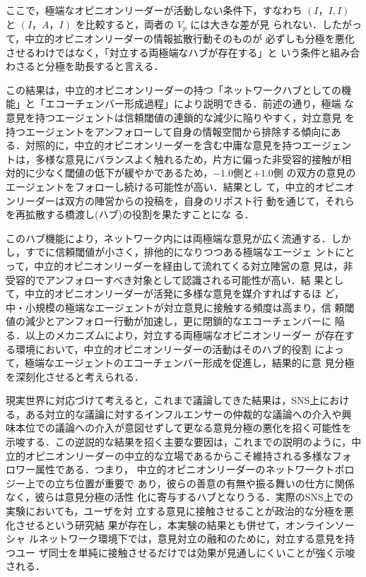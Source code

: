 \documentclass[a4j]{ujarticle}
\def\postOpVar{V_p}
\begin{document}
ここで，極端なオピニオンリーダーが活動しない条件下，すなわち $(I，I,
I)$ と $(I，A，I)$ を比較すると，両者の $\postOpVar$ には大きな差が見
られない．したがって，中立的オピニオンリーダーの情報拡散行動そのものが
必ずしも分極を悪化させるわけではなく，「対立する両極端なハブが存在する」と
いう条件と組み合わさると分極を助長すると言える．
\par


この結果は，中立的オピニオンリーダーの持つ「ネットワークハブとしての機
  能」と「エコーチェンバー形成過程」により説明できる．前述の通り，極端
な意見を持つエージェントは信頼閾値の連鎖的な減少に陥りやすく，対立意見
を持つエージェントをアンフォローして自身の情報空間から排除する傾向にあ
る．対照的に，中立的オピニオンリーダーを含む中庸な意見を持つエージェン
トは，多様な意見にバランスよく触れるため，片方に偏った非受容的接触が相
対的に少なく閾値の低下が緩やかであるため，$-1.0$側と$+1.0$側
の双方の意見のエージェントをフォローし続ける可能性が高い．結果とし
て，中立的オピニオンリーダーは双方の陣営からの投稿を，自身のリポスト行
動を通じて，それらを再拡散する橋渡し(ハブ)の役割を果たすことにな
る．
\par


このハブ機能により，ネットワーク内には両極端な意見が広く流通する．しか
し，すでに信頼閾値が小さく，排他的になりつつある極端なエージェ
ントにとって，中立的オピニオンリーダーを経由して流れてくる対立陣営の意
見は，非受容的でアンフォローすべき対象として認識される可能性が高い．結
果として，中立的オピニオンリーダーが活発に多様な意見を媒介すればするほ
ど，中・小規模の極端なエージェントが対立意見に接触する頻度は高まり，信
頼閾値の減少とアンフォロー行動が加速し，更に閉鎖的なエコーチェンバーに
陥る．以上のメカニズムにより，対立する両極端なオピニオンリーダー
が存在する環境において，中立的オピニオンリーダーの活動はそのハブ的役割
によって，極端なエージェントのエコーチェンバー形成を促進し，結果的に意
見分極を深刻化させると考えられる．
\par


現実世界に対応づけて考えると，これまで議論してきた結果は，SNS上におけ
る，ある対立的な議論に対するインフルエンサーの仲裁的な議論への介入や興
味本位での議論への介入が意図せずして更なる意見分極の悪化を招く可能性を
示唆する．この逆説的な結果を招く主要な要因は，これまでの説明のように，中
立的オピニオンリーダーの中立的な立場であるからこそ維持される多様なフォ
ロワー属性である．つまり，
中立的オピニオンリーダーのネットワークトポロジー上での立ち位置が重要で
あり，彼らの善意の有無や振る舞いの仕方に関係なく，彼らは意見分極の活性
化に寄与するハブとなりうる．実際のSNS上での実験においても，ユーザを対
立する意見に接触させることが政治的な分極を悪化させるという研究結
果\cite{Bail2018}が存在し，本実験の結果とも併せて，オンラインソーシャ
ルネットワーク環境下では，意見対立の融和のために，対立する意見を持つユー
ザ同士を単純に接触させるだけでは効果が見通しにくいことが強く示唆される．
\par
\end{document}
